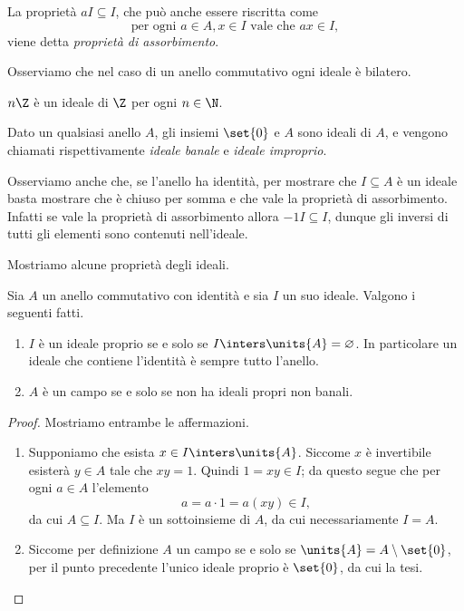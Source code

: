 La proprietà $aI \subseteq I$, che può anche essere riscritta come \[
    \text{per ogni } a \in A, x \in I \text{ vale che } ax \in I,
\] viene detta \emph{proprietà di assorbimento}.

Osserviamo che nel caso di un anello commutativo ogni ideale è bilatero.
\begin{example}
    $n\Z$ è un ideale di $\Z$ per ogni $n \in \N$.
\end{example}
\begin{example}
    Dato un qualsiasi anello $A$, gli insiemi $\set{0}$ e $A$ sono ideali di $A$, e vengono chiamati rispettivamente \emph{ideale banale} e \emph{ideale improprio}.
\end{example}

Osserviamo anche che, se l'anello ha identità, per mostrare che $I \subseteq A$ è un ideale basta mostrare che è chiuso per somma e che vale la proprietà di assorbimento. Infatti se vale la proprietà di assorbimento allora $-1I \subseteq I$, dunque gli inversi di tutti gli elementi sono contenuti nell'ideale.

Mostriamo alcune proprietà degli ideali.
\begin{proposition}
    Sia $A$ un anello commutativo con identità e sia $I$ un suo ideale. Valgono i seguenti fatti. 
    \begin{enumerate}[label={(\roman*)}]
        \item $I$ è un ideale proprio se e solo se $I \inters \units{A} = \varnothing$. In particolare un ideale che contiene l'identità è sempre tutto l'anello.
        \item $A$ è un campo se e solo se non ha ideali propri non banali.
    \end{enumerate}
\end{proposition}
\begin{proof}
    Mostriamo entrambe le affermazioni.
    \begin{enumerate}[label={(\roman*)}]
        \item Supponiamo che esista $x \in I \inters \units{A}$. Siccome $x$ è invertibile esisterà $y \in A$ tale che $xy = 1$. Quindi $1 = xy \in I$; da questo segue che per ogni $a \in A$ l'elemento \[
            a = a\cdot 1 = a(xy) \in I,
        \] da cui $A \subseteq I$. Ma $I$ è un sottoinsieme di $A$, da cui necessariamente $I = A$.
        \item Siccome per definizione $A$ un campo se e solo se $\units{A} = A \setminus \set{0}$, per il punto precedente l'unico ideale proprio è $\set{0}$, da cui la tesi. \qedhere
    \end{enumerate}
\end{proof}

